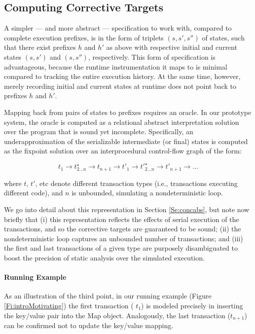 \subsection{Computing Corrective Targets}

A simpler --- and more abstract --- specification to work with, compared to complete execution prefixes, is in the form of triplets $(s,s',s'')$ of states, such that there exist prefixes $h$ and $h'$ as above with respective initial and current states $(s,s')$ and $(s,s'')$, respectively. This form of specification is advantageous, because the runtime instrumentation it maps to is minimal compared to tracking the entire execution history. At the same time, however, merely recording initial and current states at runtime does not point back to prefixes $h$ and $h'$.

Mapping back from pairs of states to prefixes requires an oracle. In our prototype system, the oracle is computed as a relational abstract interpretation solution over the program that is sound yet incomplete. Specifically, an underapproximation of the serializable intermediate (or final) states is computed as the fixpoint solution over an interprocedural control-flow graph of the form: 
\begin{center}
$$
	t_1 \rightarrow t^\star_{2 \ldots n} \rightarrow t_{n+1} \rightarrow t'_1 \rightarrow t'^\star_{2 \ldots n} \rightarrow t'_{n+1} \rightarrow \ldots
$$
\end{center}
where $t$, $t'$, etc denote different transaction types (i.e., transactions executing different code), and $n$ is unbounded, simulating a nondeterministic loop. 

We go into detail about this representation in Section \ref{Se:concabs}, but note now briefly that (i) this representation reflects the effects of serial execution of the transactions, and so the corrective targets are guaranteed to be sound; (ii) the nondeterministic loop captures an unbounded number of transactions; and (iii) the first and last transactions of a given type are purposely disambiguated to boost the precision of static analysis over the simulated execution.

\paragraph{Running Example} As an illustration of the third point, in our running example (Figure \ref{Fi:introMotivating}) the first transaction ( $t_1$) is modeled precisely in inserting the key/value pair into the {\sf Map} object. Analogously, the last transaction ($t_{n+1}$) can be confirmed not to update the key/value mapping.

